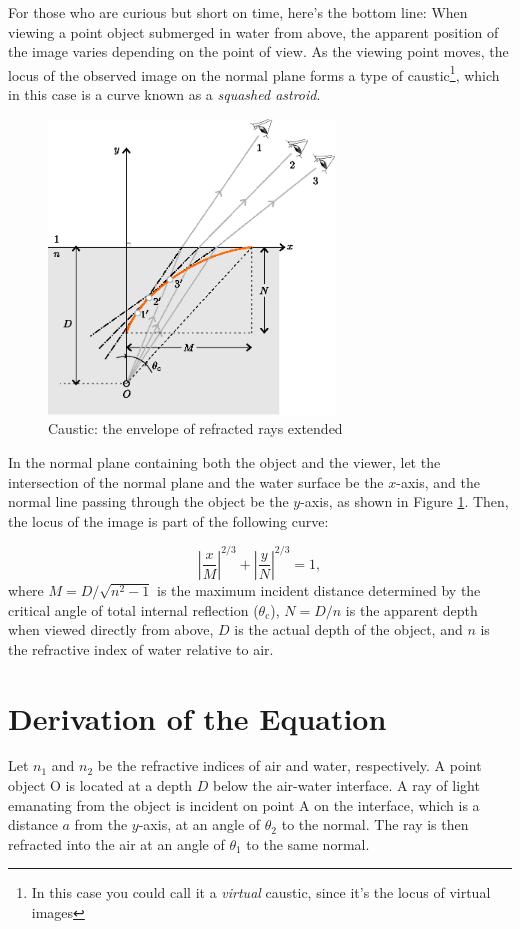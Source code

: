 \documentclass[twocolumn]{article}
\begin{document}
For those who are curious but short on time, here's the bottom line: When viewing a point object submerged in water from above, the apparent position of the image varies depending on the point of view. As the viewing point moves, the locus of the observed image on the normal plane forms a type of caustic\footnote{In this case you could call it a \emph{virtual} caustic, since it's the locus of virtual images}, which in this case is a curve known as a \emph{squashed astroid}.

\begin{figure}
	\centering
	\includegraphics[width=3in]{figs/g409.eps}
	\caption{Caustic: the envelope of refracted rays extended}
	\label{fig:caustic}
\end{figure}

In the normal plane containing both the object and the viewer, let the intersection of the normal plane and the water surface be the $x$-axis, and the normal line passing through the object be the $y$-axis, as shown in Figure \ref{fig:caustic}. Then, the locus of the image is part of the following curve:

$$ \left| \dfrac{x}{M} \right| ^ {2/3} + \left| \dfrac{y}{N} \right| ^ {2/3} = 1,$$
where $M = D/\sqrt{n^2 - 1}$ is the maximum incident distance determined by the critical angle of total internal reflection ($\theta_{\mathrm{c}}$), $N = D/n$ is the apparent depth when viewed directly from above, $D$ is the actual depth of the object, and $n$ is the refractive index of water relative to air.

\section{Derivation of the Equation}

Let $n_1$ and $n_2$ be the refractive indices of air and water, respectively. A point object $\mathrm{O}$ is located at a depth $D$ below the air-water interface. A ray of light emanating from the object is incident on point $\mathrm{A}$ on the interface, which is a distance $a$ from the $y$-axis, at an angle of $\theta_2$ to the normal. The ray is then refracted into the air at an angle of $\theta_1$ to the same normal.
\end{document}
